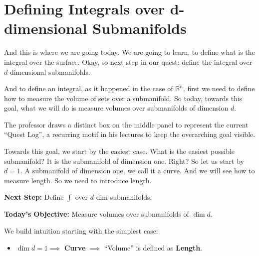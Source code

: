 
\section{Defining Integrals over d-dimensional Submanifolds}

\begin{spoken-clean}[00:02:40 - 00:03:35]
And this is where we are going today. We are going to learn, to define what is the integral over the surface. Okay, so next step in our quest: define the integral over $d$-dimensional submanifolds. 

And to define an integral, as it happened in the case of $\mathbb{R}^n$, first we need to define how to measure the volume of sets over a submanifold. So today, towards this goal, what we will do is measure volumes over submanifolds of dimension $d$. 
\end{spoken-clean}

\begin{nice-box}
The professor draws a distinct box on the middle panel to represent the current ``Quest Log'', a recurring motif in his lectures to keep the overarching goal visible.
\end{nice-box}

\begin{spoken-clean}[00:03:35 - 00:04:20]
Towards this goal, we start by the easiest case. What is the easiest possible submanifold? It is the submanifold of dimension one. Right? So let us start by $d=1$. A submanifold of dimension one, we call it a curve. And we will see how to measure length. So we need to introduce length.
\end{spoken-clean}

\begin{math-stroke}
\textbf{Next Step:} Define $\int$ over $d$-dim submanifolds.

\textbf{Today's Objective:} Measure volumes over submanifolds of $\dim d$.

We build intuition starting with the simplest case:
\begin{itemize}
    \item $\dim d = 1 \implies$ \textbf{Curve} $\implies$ ``Volume'' is defined as \textbf{Length}.
\end{itemize}
\end{math-stroke}

